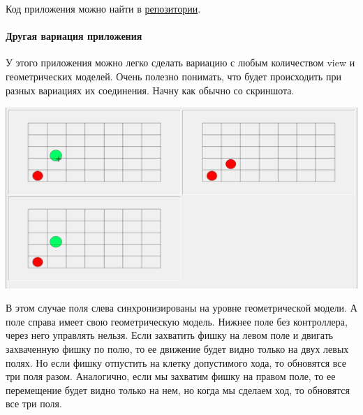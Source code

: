 Код приложения можно найти в \href{https://github.com/DimaTrushin/InteractiveGUI}{репозитории}.

\paragraph{Другая вариация приложения}

У этого приложения можно легко сделать вариацию с любым количеством view и геометрических моделей.
Очень полезно понимать, что будет происходить при разных вариациях их соединения.
Начну как обычно со скриншота.
\begin{center}
\includegraphics[scale=0.4]{Figures/Game2.JPG}
\end{center}
В этом случае поля слева синхронизированы на уровне геометрической модели.
А поле справа имеет свою геометрическую модель.
Нижнее поле без контроллера, через него управлять нельзя.
Если захватить фишку на левом поле и двигать захваченную фишку по полю, то ее движение будет видно только на двух левых полях.
Но если фишку отпустить на клетку допустимого хода, то обновятся все три поля разом.
Аналогично, если мы захватим фишку на правом поле, то ее перемещение будет видно только на нем, но когда мы сделаем ход, то обновятся все три поля.

